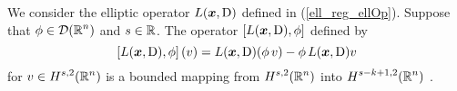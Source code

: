 \begin{lemma} \label{ell_reg_in_lem1}
We consider the elliptic operator $L({\bm{x}},\operatorname{D})$ defined in
(\ref{ell_reg_ellOp}).  Suppose that $\displaystyle \phi \in \mathcal{D}(\mathbb{R}^n)$
and $s\in \mathbb{R}$.
The operator $\left[ L({\bm{x}},\operatorname{D}), \phi\right]$ defined by
\[
\left[ L({\bm{x}},\operatorname{D}), \phi\right](v)
= L({\bm{x}},\operatorname{D}) (\phi\, v) - \phi\, L({\bm{x}},\operatorname{D}) v
\]
for $\displaystyle v \in \displaystyle H^{s,2}(\mathbb{R}^n)$ is a bounded mapping from
$\displaystyle H^{s,2}(\mathbb{R}^n)$ into $\displaystyle H^{s-k+1,2}(\mathbb{R}^n)$
\footnotemark.
\end{lemma}


